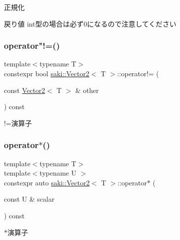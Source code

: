 正規化 

\begin{DoxyReturn}{戻り値}
int型の場合は必ず0になるので注意してください 
\end{DoxyReturn}
\mbox{\label{classsaki_1_1_vector2_a060dff3676c9f427fba232c301e011b7}} 
\subsubsection{\texorpdfstring{operator"!=()}{operator!=()}}
{\footnotesize\ttfamily template$<$typename T$>$ \\
constexpr bool \mbox{\hyperlink{classsaki_1_1_vector2}{saki\+::\+Vector2}}$<$ T $>$\+::operator!= (\begin{DoxyParamCaption}\item[{const \mbox{\hyperlink{classsaki_1_1_vector2}{Vector2}}$<$ T $>$ \&}]{other }\end{DoxyParamCaption}) const\hspace{0.3cm}{\ttfamily [inline]}}



!=演算子 

\mbox{\label{classsaki_1_1_vector2_aaaac42e1c348c453fad5ac0f2b7029d7}} 
\subsubsection{\texorpdfstring{operator$\ast$()}{operator*()}}
{\footnotesize\ttfamily template$<$typename T$>$ \\
template$<$typename U $>$ \\
constexpr auto \mbox{\hyperlink{classsaki_1_1_vector2}{saki\+::\+Vector2}}$<$ T $>$\+::operator$\ast$ (\begin{DoxyParamCaption}\item[{const U \&}]{scalar }\end{DoxyParamCaption}) const\hspace{0.3cm}{\ttfamily [inline]}}



$\ast$演算子 

\mbox{\label{classsaki_1_1_vector2_a768d67bdb12d0e2bcac53fbebaf946aa}} 
